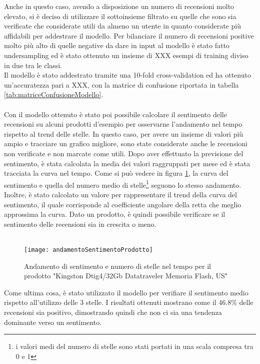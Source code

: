 Anche in questo caso, avendo a disposizione un numero di recensioni molto elevato, si è deciso di utilizzare il sottoinsieme filtrato su quelle che sono sia verificate che considerate utili da almeno un utente in quanto considerate più affidabili per addestrare il modello. Per bilanciare il numero di recensioni positive molto più alto di quelle negative da dare in input al modello è stato fatto undersampling ed è stato ottenuto un insieme di XXX esempi di training diviso in due tra le classi. \\
Il modello è stato addestrato tramite una 10-fold cross-validation ed ha ottenuto un'accuratezza pari a XXX, con la matrice di confusione riportata in tabella \ref{tab:matriceConfusioneModello}. \\\\

Con il modello ottenuto è stato poi possibile calcolare il sentimento delle recensioni su alcuni prodotti d'esempio per osservarne l'andamento nel tempo rispetto al trend delle stelle. In questo caso, per avere un insieme di valori più ampio e tracciare un grafico migliore, sono state considerate anche le recensioni non verificate e non marcate come utili. Dopo aver effettuato la previsione del sentimento, è stata calcolata la media dei valori raggruppati per mese ed è stata tracciata la curva nel tempo. Come si può vedere in figura \ref{fig:andamentoSentimentoProdotto}, la curva del sentimento e quella del numero medio di stelle\footnote{i valori medi del numero di stelle sono stati portati in una scala compresa tra 0 e 1} seguono lo stesso andamento. Inoltre, è stato calcolato un valore per rappresentare il trend della curva del sentimento, il quale corrisponde al coefficiente angolare della retta che meglio approssima la curva. Dato un prodotto, è quindi possibile verificare se il sentimento delle recensioni sia in crescita o meno. \\\\

\begin{figure}[]
    \texttt{[image: andamentoSentimentoProdotto]}\centering
    \caption{Andamento di sentimento e numero di stelle nel tempo per il prodotto "Kingston Dtig4/32Gb Datatraveler Memoria Flash, US"}\label{fig:andamentoSentimentoProdotto}
\end{figure}

Come ultima cosa, è stato utilizzato il modello per verifiare il sentimento medio rispetto all'utilizzo delle 3 stelle. I risultati ottenuti mostrano come il 46.8\% delle recensioni sia positivo, dimostrando quindi che non ci sia una tendenza dominante verso un sentimento.


